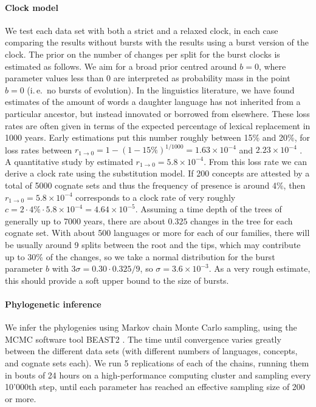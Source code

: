 \documentclass[]{rsos}%
\begin{document}
\paragraph{Clock model}
We test each data set with both a strict and a relaxed clock, in each case
comparing the results without bursts with the results
using a burst version of the clock. The prior on the number of changes per split for the 
burst clocks is estimated as follows. We aim for a broad prior centred around $b=0$,
where parameter values less than 0 are interpreted as probability mass in the point $b=0$ (i.\,e.\ no  bursts of evolution).
In the linguistics literature, we have found estimates of the amount of words a daughter language has not inherited from a particular ancestor, but instead innovated or borrowed from elsewhere. These loss rates are often
given in terms of the expected percentage of lexical
replacement in 1000 years. Early estimations
put this number roughly between 15\% and 20\%,
for loss rates between
$ r_{1 \rightarrow 0} = 1-(1 - 15\%)^{1/1000} = 1.63 × 10^{-4}$ and $2.23 × 10^{-4}$ \parencite{swadesh1955greater}.
A quantitative study by \textcite[p. 405]{pagel2000history} estimated $r_{1 \rightarrow 0} = 5.8 × 10^{-4}$.
From this loss rate we can derive a clock rate using the substitution model.
If 200 concepts are attested by a total of 5000 cognate sets and thus the frequency of presence is around 4\%, then $r_{1 \rightarrow 0} = 5.8 × 10^{-4}$
corresponds to a clock rate of very roughly $c = 2 \cdot 4\% \cdot 5.8 × 10^{-4}=4.64\times 10^{-5}$.
Assuming a time depth of the trees of generally up to 7000 years,
there are about $0.325$ changes in the tree for each cognate set. With about 500 languages or more for each of our 
families, there will be usually around 9 splits between the root and the
tips, which may contribute up to 30\% \parencite{atkinson2008languages} of the changes, so we take a
normal distribution for the burst parameter $b$ with $3\sigma = 0.30 \cdot 0.325 / 9$, so $\sigma=3.6 \times 10^{-3}$.
As a very rough estimate, this should provide a soft upper bound to the size of bursts.

\paragraph{Phylogenetic inference}
We infer the phylogenies using Markov chain Monte Carlo sampling, using the MCMC
software tool BEAST2 \parencite{drummond2015bayesian}. The time until convergence varies greatly
between the different data sets (with different numbers of languages, concepts, and
cognate sets each).
We run 5 replications of each of the chains, running them in bouts of 24 hours on a high-performance
computing cluster and sampling every 10'000th step, until each parameter has reached an effective sampling size of 
200 or more.
\end{document}
